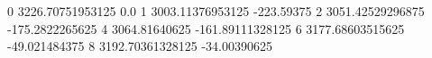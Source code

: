0 3226.70751953125 0.0
1 3003.11376953125 -223.59375
2 3051.42529296875 -175.2822265625
4 3064.81640625 -161.89111328125
6 3177.68603515625 -49.021484375
8 3192.70361328125 -34.00390625
